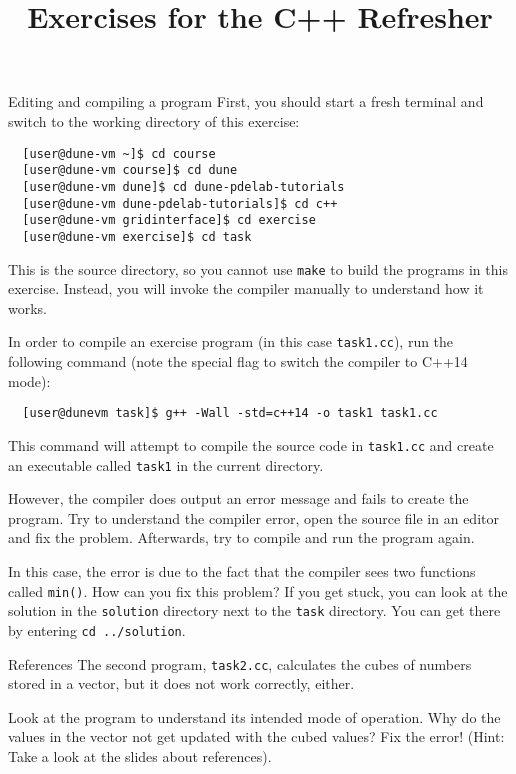 \documentclass[12pt,a4paper]{article}
\title{\textbf{Exercises for the C++ Refresher}}
\begin{document}
\exerciseheader

\begin{Exercise}{Editing and compiling a program}
First, you should start a fresh terminal and switch to the working directory of this exercise:
\begin{lstlisting}
  [user@dune-vm ~]$ cd course
  [user@dune-vm course]$ cd dune
  [user@dune-vm dune]$ cd dune-pdelab-tutorials
  [user@dune-vm dune-pdelab-tutorials]$ cd c++
  [user@dune-vm gridinterface]$ cd exercise
  [user@dune-vm exercise]$ cd task
\end{lstlisting}

This is the source directory, so you cannot use \lstinline!make! to build the programs in this exercise.
Instead, you will invoke the compiler manually to understand how it works.

In order to compile an exercise program (in this case \lstinline!task1.cc!), run the following command (note
the special flag to switch the compiler to C++14 mode):

\begin{lstlisting}
  [user@dunevm task]$ g++ -Wall -std=c++14 -o task1 task1.cc
\end{lstlisting}

This command will attempt to compile the source code in \lstinline!task1.cc! and create an executable called \lstinline!task1! in the current directory.

However, the compiler does output an error message and fails to create the program. Try to understand the compiler error, open the source file in an editor and fix the problem. Afterwards, try to compile and run the program again.

In this case, the error is due to the fact that the compiler sees two functions called \texttt{min()}. How
can you fix this problem? If you get stuck, you can look at the solution in the \lstinline!solution! directory next to the \lstinline!task! directory. You can get there by entering \lstinline!cd ../solution!.

\end{Exercise}

\begin{Exercise}{References}
The second program, \lstinline!task2.cc!, calculates the cubes of numbers stored in a vector, but it does not
work correctly, either.

Look at the program to understand its intended mode of operation. Why do the values in the vector not get
updated with the cubed values? Fix the error! (Hint: Take a look at the slides about references).

\end{Exercise}
\end{document}
